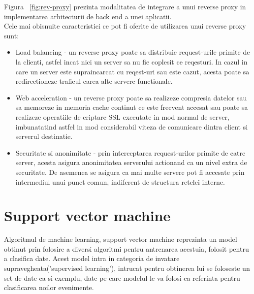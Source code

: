 Figura ~\ref{fig:rev-proxy} prezinta modalitatea de integrare a unui reverse proxy in implementarea arhitecturii de back end a unei aplicatii. \\

Cele mai obisnuite caracteristici ce pot fi oferite de utilizarea unui reverse proxy sunt:
\begin{itemize}
	\item Load balancing - un reverse proxy poate sa distribuie request-urile primite de la clienti, astfel incat nici un server sa nu fie coplesit ce reqesturi. In cazul in care un server este supraincarcat cu reqest-uri sau este cazut, acesta poate sa redirectioneze traficul carea alte servere functionale.
	\item Web acceleration - un reverse proxy poate sa realizeze compresia datelor sau sa memoreze in memoria cache continut ce este frecvent accesat sau poate sa realizeze operatiile de criptare SSL executate in mod normal de server, imbunatatind astfel in mod considerabil viteza de comunicare dintra client si serverul destinatie.
	\item Securitate si anonimitate - prin interceptarea request-urilor primite de catre server, acesta asigura anonimitatea serverului actionand ca un nivel extra de securitate. De asemenea se asigura ca mai multe servere pot fi accesate prin intermediul unui punct comun, indiferent de structura retelei interne.
\end{itemize}



\section{Support vector machine}

Algoritmul de machine learning, support vector machine reprezinta un model obtinut prin folosire a diversi algoritmi pentru antrenarea acestuia, folosit pentru a clasifica date. Acest model intra in categoria de invatare supravegheata('supervised learning'), intrucat pentru obtinerea lui se foloseste un set de date ca si exemplu, date pe care modelul le va folosi ca referinta pentru clasificarea noilor evenimente.

